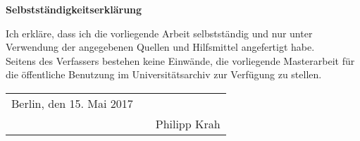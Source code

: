 \begin{center}
{\sffamily \bfseries\Large Selbstständigkeitserklärung}\\
\end{center}%
\vspace{1cm}
%
Ich erkläre, dass ich die vorliegende Arbeit selbstständig und nur unter Verwendung der angegebenen Quellen und Hilfsmittel angefertigt habe.\\[0.2cm]
\noindent Seitens des Verfassers bestehen keine Einwände, die vorliegende Masterarbeit für die öffentliche Benutzung im Universitätsarchiv zur Verfügung zu stellen.\\[2cm]

\hspace{-1cm}
\begin{tabular}{p{5.5cm}p{2.5cm}c}
Berlin, den 15. Mai 2017   && \hrulefill\\%
     && \hspace{1cm}Philipp Krah \hspace{1cm}
\end{tabular} 